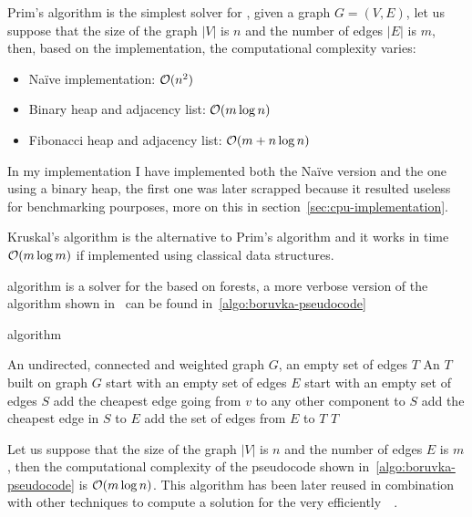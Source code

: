 \documentclass[a4paper,10pt]{article}
\begin{document}
Prim's algorithm is the simplest solver for \mstp, given a graph $G= (V, E)$, let us suppose that the size of the graph $|V|$ is $n$ and the number of edges $|E|$ is $m$, then, based on the implementation, the computational complexity varies:
\begin{itemize}
	\item Na\"ive implementation: $\mathcal{O}(n^2)$
	\item Binary heap and adjacency list: $\mathcal{O}(m\log{n})$
	\item Fibonacci heap and adjacency list: $\mathcal{O}(m + n\log{n})$
\end{itemize}
In my implementation I have implemented both the Na\"ive version and the one using a binary heap, the first one was later scrapped because it resulted useless for benchmarking pourposes, more on this in section~\ref{sec:cpu-implementation}.

Kruskal's algorithm is the alternative to Prim's algorithm and it works in time $\mathcal{O}(m\log{m})$ if implemented using classical data structures.

\brkas algorithm is a solver for the \mstp based on forests, a more verbose version of the algorithm shown in~\cite{boruvka-pseudocode} can be found in~\ref{algo:boruvka-pseudocode}
\begin{algorithm}
	\caption{\brkas algorithm}
	\label{algo:boruvka-pseudocode}
	\begin{algorithmic}[1]
		\REQUIRE An undirected, connected and weighted graph $G$, an empty set of edges $T$
		\ENSURE An \mst$T$ built on graph $G$
		\STATE start with an empty set of edges $E$
		\STATE start with an empty set of edges $S$
		\STATE add the cheapest edge going from $v$ to any other component to $S$
		\ENDFOR
		\STATE add the cheapest edge in $S$ to $E$
		\ENDFOR
		\STATE add the set of edges from $E$ to $T$
		\ENDWHILE
		\STATE\RETURN $T$
	\end{algorithmic}
\end{algorithm}

Let us suppose that the size of the graph $|V|$ is $n$ and the number of edges $E$ is $m$, then the computational complexity of the pseudocode shown in~\ref{algo:boruvka-pseudocode} is $\mathcal{O}(m\log{n})$. This algorithm has been later reused in combination with other techniques to compute a solution for the \mstp very efficiently~\cite{boruvka-ackermann}~\cite{karger-klein-tarjan}.
\end{document}
